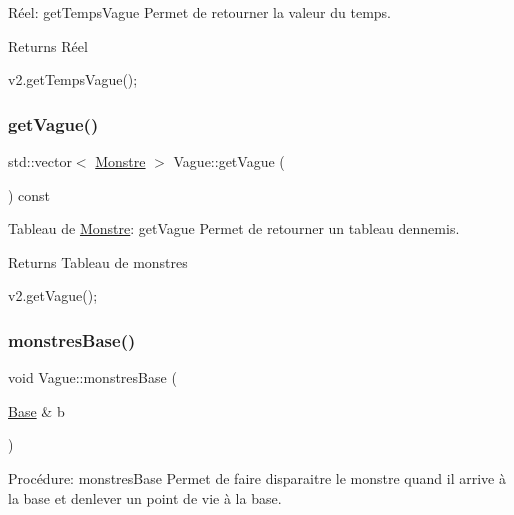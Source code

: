 Réel\+: get\+Temps\+Vague Permet de retourner la valeur du temps. 

\begin{DoxyReturn}{Returns}
Réel 
\begin{DoxyCode}
v2.getTempsVague();
\end{DoxyCode}
 
\end{DoxyReturn}
\mbox{\label{classVague_a9a23bacd87181f297f522152adb51c36}} 
\subsubsection{\texorpdfstring{get\+Vague()}{getVague()}}
{\footnotesize\ttfamily std\+::vector$<$ \hyperlink{classMonstre}{Monstre} $>$ Vague\+::get\+Vague (\begin{DoxyParamCaption}{ }\end{DoxyParamCaption}) const}



Tableau de \hyperlink{classMonstre}{Monstre}\+: get\+Vague Permet de retourner un tableau d\textquotesingle{}ennemis. 

\begin{DoxyReturn}{Returns}
Tableau de monstres 
\begin{DoxyCode}
v2.getVague();
\end{DoxyCode}
 
\end{DoxyReturn}
\mbox{\label{classVague_ad9d543a1eafc579d8a4de88d278a53a7}} 
\subsubsection{\texorpdfstring{monstres\+Base()}{monstresBase()}}
{\footnotesize\ttfamily void Vague\+::monstres\+Base (\begin{DoxyParamCaption}\item[{\hyperlink{classBase}{Base} \&}]{b }\end{DoxyParamCaption})}



Procédure\+: monstres\+Base Permet de faire disparaitre le monstre quand il arrive à la base et d\textquotesingle{}enlever un point de vie à la base. 


